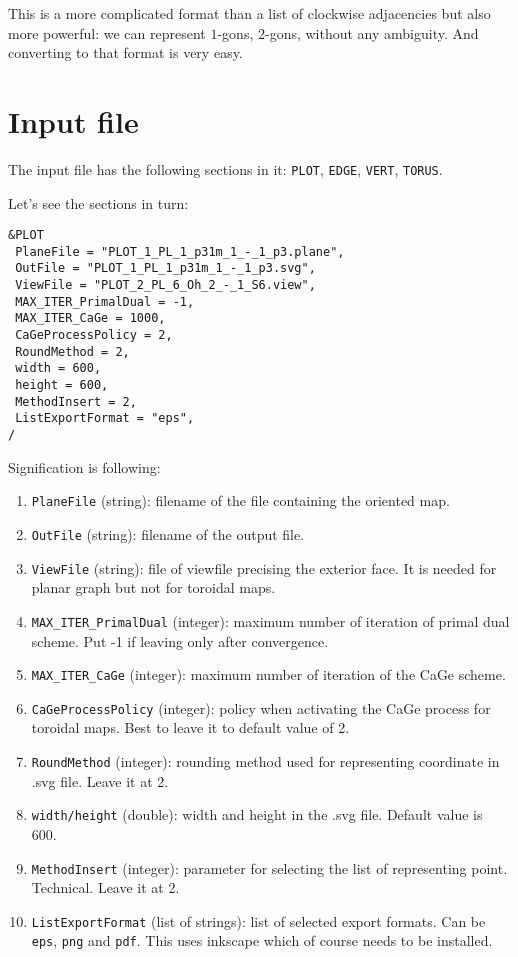 \documentclass[12pt]{amsart}
\begin{document}
This is a more complicated format than a list of clockwise adjacencies but also more powerful: we can represent $1$-gons, $2$-gons, without any ambiguity. And converting to that format is very easy.


\section{Input file}

The input file has the following sections in it: {\tt PLOT}, {\tt EDGE}, {\tt VERT}, {\tt TORUS}.


Let's see the sections in turn:
\begin{verbatim}
&PLOT
 PlaneFile = "PLOT_1_PL_1_p31m_1_-_1_p3.plane",
 OutFile = "PLOT_1_PL_1_p31m_1_-_1_p3.svg",
 ViewFile = "PLOT_2_PL_6_Oh_2_-_1_S6.view",
 MAX_ITER_PrimalDual = -1,
 MAX_ITER_CaGe = 1000,
 CaGeProcessPolicy = 2,
 RoundMethod = 2,
 width = 600,
 height = 600,
 MethodInsert = 2,
 ListExportFormat = "eps",
/
\end{verbatim}

Signification is following:
\begin{enumerate}
\item {\tt PlaneFile} (string): filename of the file containing the oriented map.
\item {\tt OutFile} (string): filename of the output file.
\item {\tt ViewFile} (string): file of viewfile precising the exterior face. It is needed for planar graph but not for toroidal maps.
\item {\tt MAX\_ITER\_PrimalDual} (integer): maximum number of iteration of primal dual scheme. Put -1 if leaving only after convergence.
\item {\tt MAX\_ITER\_CaGe} (integer): maximum number of iteration of the CaGe scheme.
\item {\tt CaGeProcessPolicy} (integer): policy when activating the CaGe process for toroidal maps. Best to leave it to default value of 2.
\item {\tt RoundMethod} (integer): rounding method used for representing coordinate in .svg file. Leave it at 2.
\item {\tt width/height} (double): width and height in the .svg file. Default value is 600.
\item {\tt MethodInsert} (integer): parameter for selecting the list of representing point. Technical. Leave it at 2.
\item {\tt ListExportFormat} (list of strings): list of selected export formats. Can be {\tt eps}, {\tt png} and {\tt pdf}. This uses inkscape which of course needs to be installed.
\end{enumerate}
\end{document}
